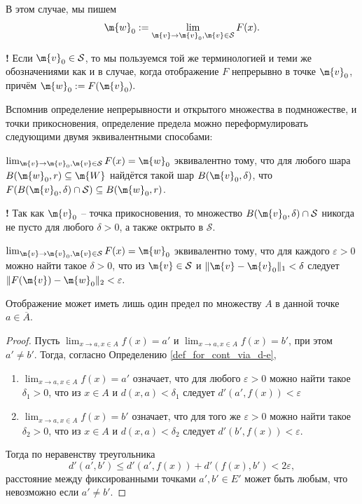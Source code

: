 В этом случае, мы пишем
\[
 \m{w}_0 := \lim_{\m{v}\to \m{v}_0, \m{v} \in \mathcal{S}} F(x).
\]

\begin{mydanger}{\bf{!}}
Если $\m{v}_0 \in \mathcal{S}$, то мы пользуемся той же терминологией и теми же обозначениями как и в случае, когда отображение $F$ непрерывно в точке $\m{v}_0$, причём $\m{w}_0:=F(\m{v}_0).$
\end{mydanger}

Вспомнив определение непрерывности и открытого множества в подмножестве, и точки прикосновения, определение предела можно переформулировать следующими двумя эквивалентными способами:

\begin{definition}
 $\lim_{\m{v}\to \m{v}_0, \m{v} \in \mathcal{S}} F(x) = \m{w}_0$ эквивалентно тому, что для любого шара $B(\m{w}_0,r) \subseteq \m{W}$ найдётся такой шар $B(\m{v}_0,\delta)$, что $F(B(\m{v}_0,\delta)\cap \mathcal{S}) \subseteq B(\m{w}_0,r)$.
\end{definition}
\begin{mydanger}{\bf{!}}
    Так как $\m{v}_0$ -- точка прикосновения, то множество $B(\m{v}_0,\delta) \cap \mathcal{S}$ никогда не пусто для любого $\delta >0$, а также октрыто в $\mathcal{S}.$
\end{mydanger}

\begin{definition}\label{def_for_cont_via_d-e}
$\lim_{\m{v}\to \m{v}_0, \m{v} \in \mathcal{S}} F(x) = \m{w}_0$ эквивалентно тому, что для каждого $\varepsilon>0$ можно найти такое $\delta >0$, что из $\m{v} \in \mathcal{S}$ и $\|\m{v} - \m{v}_0\|_1 <\delta$ следует $\|F(\m{v}) - \m{w}_0\|_2<\varepsilon.$
\end{definition}

\begin{proposition}
    Отображение может иметь лишь один предел по множеству $A$ в данной точке $a \in \overline{A}.$
\end{proposition}
\begin{proof}
    Пусть  $\lim_{x \to a, x \in A}f(x) = a'$ и  $\lim_{x \to a, x \in A}f(x) = b'$, при этом $a' \ne b'$. Тогда, согласно Определению \ref{def_for_cont_via_d-e}, 
 \begin{enumerate}
     \item  $\lim_{x \to a, x \in A}f(x) = a'$ означает, что для любого $\varepsilon >0$ можно найти такое $\delta_1 >0$, что из $x \in A$ и $d(x,a)<\delta_1$ следует $d'(a',f(x))<\varepsilon$
     \item $\lim_{x \to a, x \in A}f(x) = b'$ означает, что для того же $\varepsilon >0$ можно найти такое $\delta_2 >0$, что из $x \in A$ и $d(x,a)<\delta_2$ следует $d'(b',f(x))<\varepsilon$.
 \end{enumerate}
Тогда по неравенству треугольника
\[
 d'(a',b') \le d'(a', f(x)) + d'(f(x), b') < 2\varepsilon,
\]
\ie расстояние между фиксированными точками $a',b' \in E'$ может быть любым, что невозможно если $a' \ne b'.$
\end{proof}

